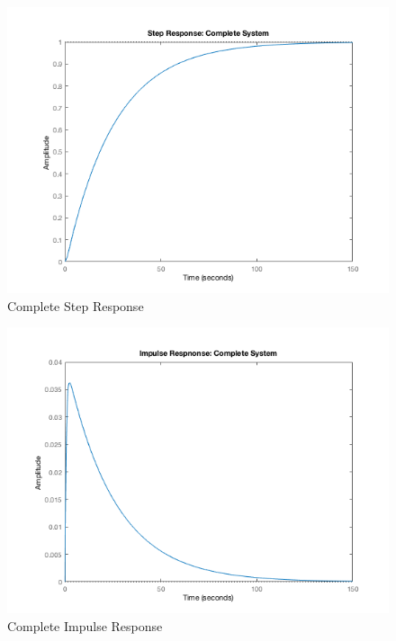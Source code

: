 \documentclass[12pt]{article}
\begin{document}
\begin{figure}[H]
\begin{center}
	\includegraphics[width=\textwidth]{./img/CompleteStep.png}
	\caption{\label{fig:completestep}Complete Step Response}
\end{center}
\end{figure}

\begin{figure}[H]
\begin{center}
	\includegraphics[width=\textwidth]{./img/CompleteImpulse.png}
	\caption{\label{fig:completeimpulse}Complete Impulse Response}
\end{center}
\end{figure}
\end{document}
